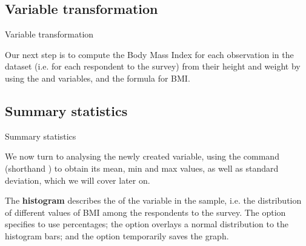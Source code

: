 \documentclass{beamer}
\begin{document}
	\subsection{Variable transformation}

	\begin{frame}[t]{Variable transformation}
	
		Our next step is to compute the Body Mass Index for each observation in the dataset (i.e. for each respondent to the survey) from their height and weight by using the  and  variables, and the formula for BMI.\vspace{1em}
		
		
			
		



		
		
	\end{frame}

	\subsection{Summary statistics}

	\begin{frame}[t]{Summary statistics}
	
		We now turn to analysing the newly created  variable, using the  command (shorthand ) to obtain its mean, min and max values, as well as standard deviation, which we will cover later on.\vspace{1em}
		
			
		


		\vspace{1em}
		
	The \textbf{histogram} describes the  of the variable in the sample, i.e. the distribution of different values of BMI among the respondents to the  survey. The  option specifies to use percentages; the  option overlays a normal distribution to the histogram bars; and the  option temporarily saves the graph.
		
	\end{frame}
\end{document}
